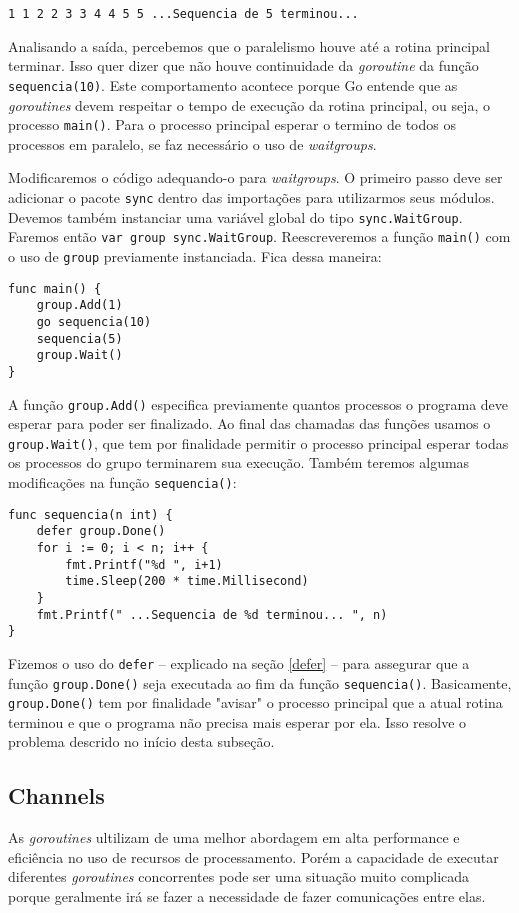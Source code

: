 \documentclass{SBCbookchapter}
\begin{document}
\noindent\texttt{1 1 2 2 3 3 4 4 5 5  ...Sequencia de 5 terminou...}

Analisando a saída, percebemos que o paralelismo houve até a rotina principal terminar. Isso quer dizer que não houve continuidade da \textit{goroutine} da função \texttt{sequencia(10)}. Este comportamento acontece porque Go entende que as \textit{goroutines} devem respeitar o tempo de execução da rotina principal, ou seja, o processo \texttt{main()}. Para o processo principal esperar o termino de todos os processos em paralelo, se faz necessário o uso de \textit{waitgroups}.

Modificaremos o código adequando-o para \textit{waitgroups}. O primeiro passo deve ser adicionar o pacote \texttt{sync} dentro das importações para utilizarmos seus módulos. Devemos também instanciar uma variável global do tipo \texttt{sync.WaitGroup}. Faremos então \texttt{var group sync.WaitGroup}. Reescreveremos a função \texttt{main()} com o uso de \texttt{group} previamente instanciada. Fica dessa maneira:

\begin{lstlisting}
func main() {
	group.Add(1)
	go sequencia(10)
	sequencia(5)
	group.Wait()
}
\end{lstlisting}

A função \texttt{group.Add()} especifica previamente quantos processos o programa deve esperar para poder ser finalizado. Ao final das chamadas das funções usamos o \texttt{group.Wait()}, que tem por finalidade permitir o processo principal esperar todas os processos do grupo terminarem sua execução. Também teremos algumas modificações na função \texttt{sequencia()}:

\begin{lstlisting}
func sequencia(n int) {
	defer group.Done()
	for i := 0; i < n; i++ {
		fmt.Printf("%d ", i+1)
		time.Sleep(200 * time.Millisecond)
	}
	fmt.Printf(" ...Sequencia de %d terminou... ", n)
}
\end{lstlisting}

Fizemos o uso do \texttt{defer} -- explicado na seção \ref{defer} -- para assegurar que a função \texttt{group.Done()} seja executada ao fim da função \texttt{sequencia()}. Basicamente, \texttt{group.Done()} tem por finalidade "avisar" o processo principal que a atual rotina terminou e que o programa não precisa mais esperar por ela. Isso resolve o problema descrido no início desta subseção.

\subsection{Channels}
As \textit{goroutines} ultilizam de uma melhor abordagem em alta performance e eficiência no uso de recursos de processamento. Porém a capacidade de executar diferentes \textit{goroutines} concorrentes pode ser uma situação muito complicada porque geralmente irá se fazer a necessidade de fazer comunicações entre elas.
\end{document}
